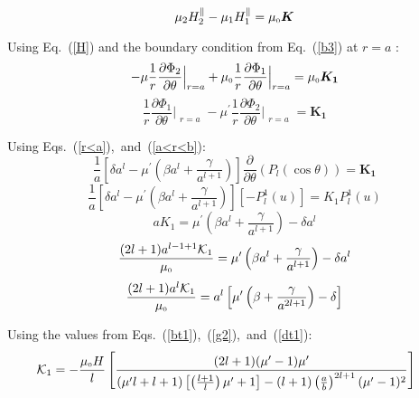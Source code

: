 \begin{equation}\label{b3}   
\mu_2 H_2^\parallel - \mu_1 H_1^\parallel =\mu_{\scriptscriptstyle 0} \bm{K}  
\end{equation}

Using Eq.~(\ref{H}) and the boundary condition from Eq.~(\ref{b3}) at $r=a$ :
$$-\mu\frac{1}{r}\frac{\partial \Phi_2}{\partial \theta}\Bigr|_{\substack{r=a}}+\mu_{\scriptscriptstyle 0} \frac{1}{r}\frac{\partial \Phi_1}{\partial \theta}\Bigr|_{\substack{r=a}}=\mu_{\scriptscriptstyle 0}\bm{K_1}  $$
$$\frac{1}{r}\frac{\partial \Phi_1}{\partial \theta}\Bigr|_{\substack{r=a}}-\mu^{\prime}\frac{1}{r}\frac{\partial \Phi_2}{\partial \theta}\Bigr|_{\substack{r=a}}=\bm{K_1}  $$

Using Eqs.~(\ref{r<a}),~and~(\ref{a<r<b}):
$$\frac{1}{a}\left[\delta a^l-\mu^{\prime}\left(\beta a^l+\frac{\gamma}{a^{l+1}}\right)\right]\frac{\partial}{\partial \theta}(P_l(\cos\theta))= \bm{K_1}$$
$$\frac{1}{a}\left[\delta a^l-\mu^{\prime} \left(\beta a^l+\frac{\gamma}{a^{l+1}}\right)\right][-P_l^1(u)]= K_1 P_l^1(u)$$
$$a K_1=\mu^{\prime}\left(\beta a^l+\frac{\gamma}{a^{l+1}}\right)-\delta a^l$$
$$\frac{(2l+1)a^{l-1+1}\mathcal{K}_1}{\mu_{\scriptscriptstyle 0}}=\mu^{\prime}\left(\beta a^l+\frac{\gamma}{a^{l+1}}\right)-\delta a^l$$
$$\frac{(2l+1)a^l\mathcal{K}_1}{\mu_{\scriptscriptstyle 0}}=a^l\left[\mu^{\prime}\left(\beta +\frac{\gamma}{a^{2l+1}}\right)-\delta \right]$$

Using the values from Eqs.~(\ref{bt1}),~(\ref{g2}),~and~(\ref{dt1}):
\begin{equation}\label{k1s}
\mathcal{K}_1=-\frac{\mu_{\scriptscriptstyle 0} H}{l}\left[\frac{(2l+1)(\mu'-1)\mu'}{(\mu'l+l+1)\left[\left(\frac{l+1}{l}\right)\mu'+1\right]-(l+1)\left(\frac{a}{b}\right)^{2l+1}(\mu'-1)^2}\right]\;\;\;\;\;
\end{equation}

